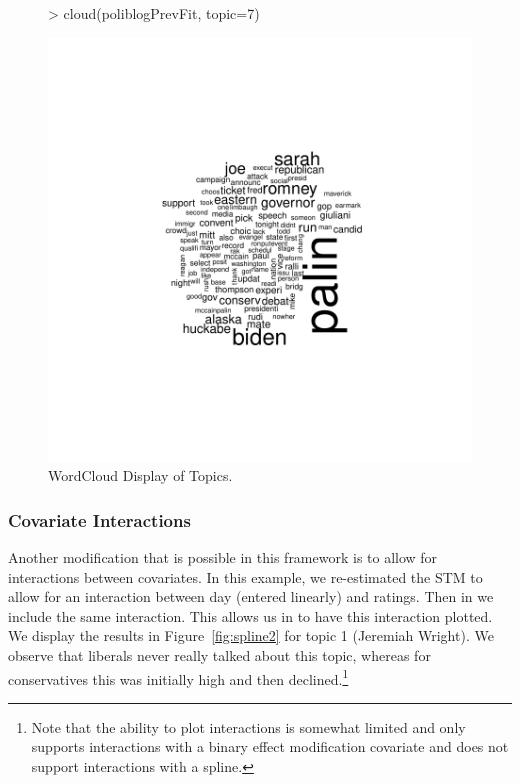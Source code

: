 \documentclass[nojss]{jss}
\begin{document}
\begin{figure}[t!]
\begin{center}
\begin{Schunk}
\begin{Sinput}
> cloud(poliblogPrevFit, topic=7)
\end{Sinput}
\end{Schunk}
\includegraphics{stmVignette-020}
\caption{WordCloud Display of Topics.}
\label{fig:cloud}
\end{center}
\end{figure}

\subsubsection{Covariate Interactions}

Another modification that is possible in this framework is to allow for interactions between covariates. In this example, we re-estimated the STM to allow for an interaction between day (entered linearly) and ratings. Then in  we include the same interaction. This allows us in  to have this interaction plotted. We display the results in Figure~\ref{fig:spline2} for topic 1 (Jeremiah Wright). We observe that liberals never really talked about this topic, whereas for conservatives this was initially high and then declined.\footnote{Note that the ability to plot interactions is somewhat limited and only supports interactions with a binary effect modification covariate and does not support interactions with a spline.}
\end{document}

